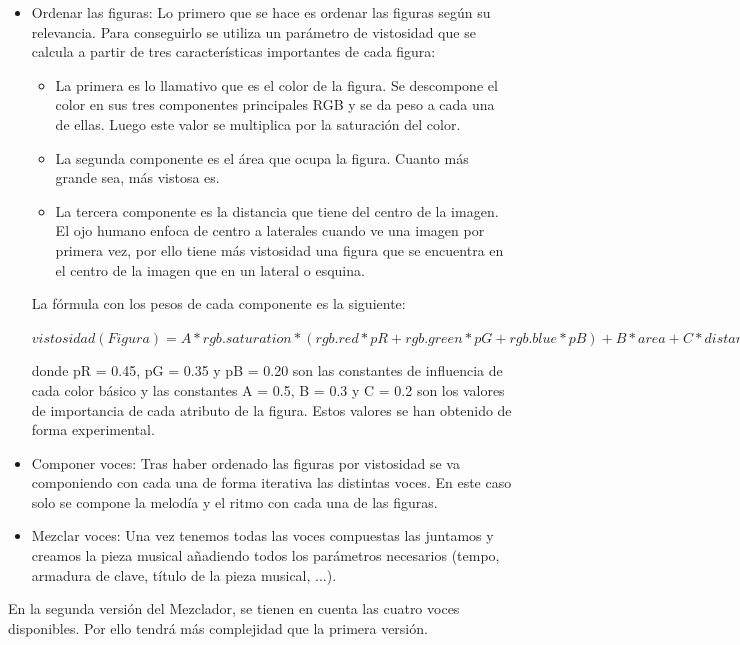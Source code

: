 \begin{itemize}
	\item Ordenar las figuras: Lo primero que se hace es ordenar las figuras según su relevancia. Para conseguirlo se utiliza un parámetro de vistosidad que se calcula a partir de tres características importantes de cada figura:
	\begin{itemize}
		\item La primera es lo llamativo que es el color de la figura. Se descompone el color en sus tres componentes principales RGB y se da peso a cada una de ellas. Luego este valor se multiplica por la saturación del color.
		\item La segunda componente es el área que ocupa la figura. Cuanto más grande sea, más vistosa es.
		\item La tercera componente es la distancia que tiene del centro de la imagen. El ojo humano enfoca de centro a laterales cuando ve una imagen por primera vez, por ello tiene más vistosidad una figura que se encuentra en el centro de la imagen que en un lateral o esquina.
	\end{itemize}
	

	La fórmula con los pesos de cada componente es la siguiente:
	\begin{center}
		$vistosidad(Figura) =
		A*rgb.saturation * (rgb.red*pR + rgb.green*pG + rgb.blue*pB)
		 + B*area + C*distanceCenter
		$
	\end{center}

donde pR = 0.45, pG = 0.35 y pB = 0.20 son las constantes de influencia de cada color básico y las constantes A = 0.5, B = 0.3 y C = 0.2 son los valores de importancia de cada atributo de la figura. Estos valores se han obtenido de forma experimental.

	\item Componer voces: Tras haber ordenado las figuras por vistosidad se va componiendo con cada una de forma iterativa las distintas voces. En este caso solo se compone la melodía y el ritmo con cada una de las figuras.

	\item Mezclar voces: Una vez tenemos todas las voces compuestas las juntamos y creamos la pieza musical añadiendo todos los parámetros necesarios (tempo, armadura de clave, título de la pieza musical, ...).

\end{itemize}

En la segunda versión del Mezclador, se tienen en cuenta las cuatro voces disponibles. Por ello tendrá más complejidad que la primera versión.

